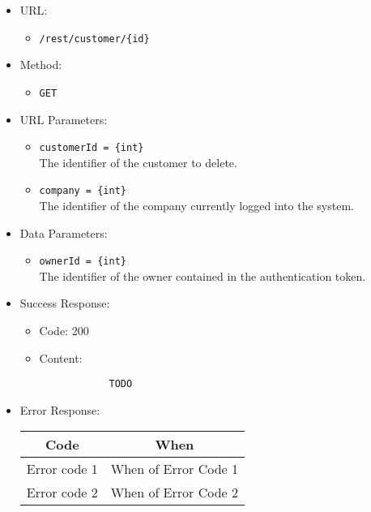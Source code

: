 \begin{itemize}
    
    \item URL: 
    \begin{itemize}
        \item \texttt{/rest/customer/\{id\}}
    \end{itemize}
    
    \item Method: 
    \begin{itemize}
        \item \texttt{GET}
    \end{itemize}
    
    \item URL Parameters: 
    \begin{itemize}
        \item \texttt{customerId = \{int\}} \\
        The identifier of the customer to delete.
        \item \texttt{company = \{int\}} \\
        The identifier of the company currently logged into the system.
    \end{itemize}
    
    \item Data Parameters: 
    \begin{itemize}
        \item \texttt{ownerId = \{int\}} \\
        The identifier of the owner contained in the authentication token.
    \end{itemize}
    
    \item Success Response: 
    \begin{itemize}
        \item Code: 200
        \item Content:
        \begin{lstlisting}
            TODO
        \end{lstlisting}    
    \end{itemize}
    
    \item Error Response:
    \begin{table}[!h]
    \centering 
    \begin{tabular}{|c|c|}
    \hline
    \multicolumn{1}{|c|}{\textbf{Code}} & \multicolumn{1}{c|}{\textbf{When}} \\ \hline
    Error code 1 & When of Error Code 1 \\\hline
    Error code 2 & When of Error Code 2 \\\hline
    \end{tabular} 
    \end{table} 
    
\end{itemize}


